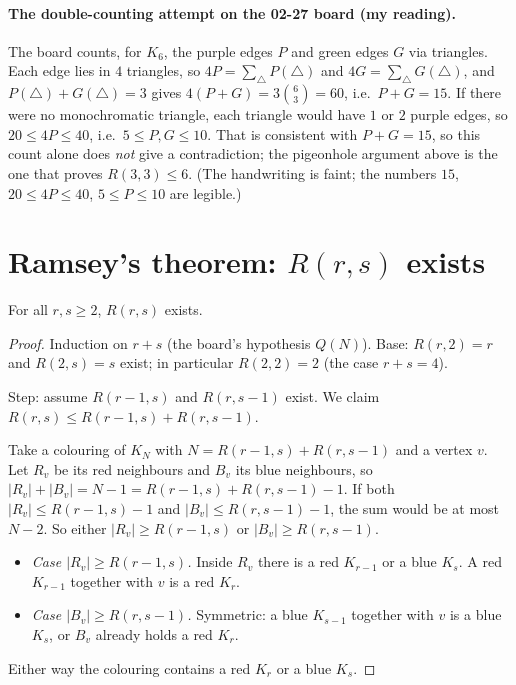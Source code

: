 \documentclass[11pt]{article}
\begin{document}
\paragraph{The double-counting attempt on the 02-27 board (my reading).} The board counts, for $K_6$, the purple edges $P$ and green edges $G$ via triangles. Each edge lies in $4$ triangles, so $4P=\sum_{\triangle}P(\triangle)$ and $4G=\sum_{\triangle}G(\triangle)$, and $P(\triangle)+G(\triangle)=3$ gives $4(P+G)=3\binom63=60$, i.e.\ $P+G=15$. If there were no monochromatic triangle, each triangle would have $1$ or $2$ purple edges, so $20\le4P\le40$, i.e.\ $5\le P,G\le10$. That is consistent with $P+G=15$, so this count alone does \emph{not} give a contradiction; the pigeonhole argument above is the one that proves $R(3,3)\le6$. (The handwriting is faint; the numbers $15$, $20\le4P\le40$, $5\le P\le10$ are legible.)

\section{Ramsey's theorem: $R(r,s)$ exists}

\begin{theorem}[Ramsey]
For all $r,s\ge2$, $R(r,s)$ exists.
\end{theorem}
\begin{proof}
Induction on $r+s$ (the board's hypothesis $Q(N)$). Base: $R(r,2)=r$ and $R(2,s)=s$ exist; in particular $R(2,2)=2$ (the case $r+s=4$).

Step: assume $R(r-1,s)$ and $R(r,s-1)$ exist. We claim $R(r,s)\le R(r-1,s)+R(r,s-1)$.

Take a colouring of $K_N$ with $N=R(r-1,s)+R(r,s-1)$ and a vertex $v$. Let $R_v$ be its red neighbours and $B_v$ its blue neighbours, so $|R_v|+|B_v|=N-1=R(r-1,s)+R(r,s-1)-1$. If both $|R_v|\le R(r-1,s)-1$ and $|B_v|\le R(r,s-1)-1$, the sum would be at most $N-2$. So either $|R_v|\ge R(r-1,s)$ or $|B_v|\ge R(r,s-1)$.
\begin{itemize}[nosep]
  \item \emph{Case $|R_v|\ge R(r-1,s)$.} Inside $R_v$ there is a red $K_{r-1}$ or a blue $K_s$. A red $K_{r-1}$ together with $v$ is a red $K_r$.
  \item \emph{Case $|B_v|\ge R(r,s-1)$.} Symmetric: a blue $K_{s-1}$ together with $v$ is a blue $K_s$, or $B_v$ already holds a red $K_r$.
\end{itemize}
Either way the colouring contains a red $K_r$ or a blue $K_s$.
\end{proof}
\end{document}
